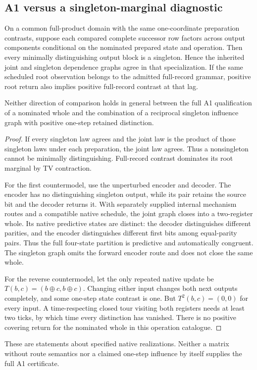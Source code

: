 \subsection{A1 versus a singleton-marginal diagnostic}
\begin{proposition}\label{p2-01}
On a common full-product domain with the same one-coordinate preparation contrasts, suppose each compared complete successor row factors across output components conditional on the nominated prepared state and operation. Then every minimally distinguishing output block is a singleton. Hence the inherited joint and singleton dependence graphs agree in that specialization. If the same scheduled root observation belongs to the admitted full-record grammar, positive root return also implies positive full-record contrast at that lag.

Neither direction of comparison holds in general between the full A1 qualification of a nominated whole and the combination of a reciprocal singleton influence graph with positive one-step retained distinction.
\end{proposition}
\begin{proof}
If every singleton law agrees and the joint law is the product of those singleton laws under each preparation, the joint law agrees. Thus a nonsingleton cannot be minimally distinguishing. Full-record contrast dominates its root marginal by TV contraction.

For the first countermodel, use the unperturbed encoder and decoder. The encoder has no distinguishing singleton output, while its pair retains the source bit and the decoder returns it. With separately supplied internal mechanism routes and a compatible native schedule, the joint graph closes into a two-register whole. Its native predictive states are distinct: the decoder distinguishes different parities, and the encoder distinguishes different first bits among equal-parity pairs. Thus the full four-state partition is predictive and automatically congruent. The singleton graph omits the forward encoder route and does not close the same whole.

For the reverse countermodel, let the only repeated native update be
\(T(b,c)=(b\oplus c,b\oplus c)\). Changing either input changes both next outputs completely, and some one-step state contrast is one. But \(T^2(b,c)=(0,0)\) for every input. A time-respecting closed tour visiting both registers needs at least two ticks, by which time every distinction has vanished. There is no positive covering return for the nominated whole in this operation catalogue.
\end{proof}
These are statements about specified native realizations. Neither a matrix without route semantics nor a claimed one-step influence by itself supplies the full A1 certificate.

